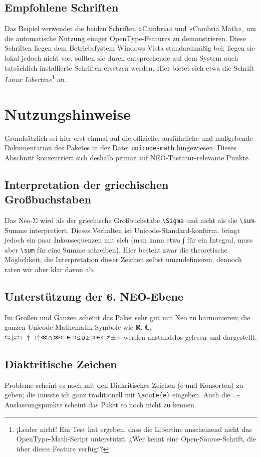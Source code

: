 ﻿\documentclass{scrartcl}
\begin{document}
\subsection{Empfohlene Schriften}
Das Beipiel verwendet die beiden Schriften »Cambria« und »Cambria Math«, um die automatische Nutzung einiger OpenType-Features zu demonstrieren. Diese Schriften liegen dem Betriebsſystem Windows Vista standardmäßig bei; liegen sie lokal jedoch nicht vor, sollten sie durch entsprechende auf dem System auch tatsächlich installierte Schriften ersetzen werden. Hier bietet sich etwa die  Schrift \emph{Linux Libertine}\footnote{¡Leider nicht! Ein Test hat ergeben, dass die Libertine anscheinend nicht das OpenType-Math-Script unterstützt. ¿Wer kennt eine Open-Source-Schrift, die über dieses Feature verfügt?} an.

\section{Nutzungshinweise}
Grundsätzlich sei hier erst einmal auf die offizielle, ausführliche und maßgebende Dokumentation des Paketes in der Datei \verb|unicode-math| hingewiesen. Dieses Abschnitt konzentriert sich deshalb primär auf NEO-Tastatur-relevante Punkte.

\subsection{Interpretation der griechischen Großbuchstaben}
Das Neo-Σ wird als der griechische Großbuchstabe \verb|\Sigma| und nicht als die \verb|\sum|-Summe interpretiert. Dieses Verhalten ist Unicode-Standard-konform, bringt jedoch ein paar Inkonsequenzen mit sich (man kann etwa ∫ für ein Integral, muss aber \verb|\sum| für eine Summe schreiben). Hier besteht zwar die theoretische Möglichkeit, die Interpretation dieser Zeichen selbst umzudefinieren, dennoch raten wir aber klar davon ab.

\subsection{Unterstützung der 6. NEO-Ebene}
Im Großen und Ganzen scheint das Paket sehr gut mit Neo zu harmonieren; die ganzen Unicode-Mathematik-Symbole wie ℝ, ℂ, ⇋↓⇌←†→↑≪∩≫⊂∊⊃≤∪≥⊃∊⊂≠±× werden anstandslos gelesen und dargestellt.

\subsection{Diaktritische Zeichen}
Probleme scheint es noch mit den Diakritisches Zeichen (é und Konsorten) zu geben; die musste ich ganz traditionell mit \verb|\acute{e}| eingeben. Auch die …-Auslassungspunkte scheint das Paket so noch nicht zu kennen.
\end{document}
